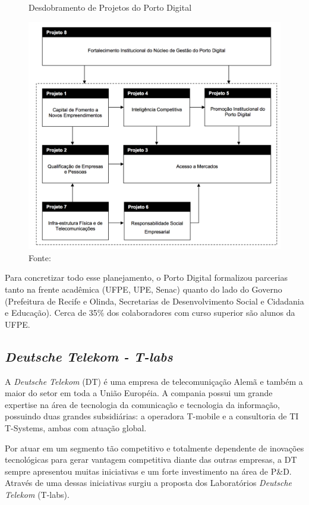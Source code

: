 \begin{figure}[h]
\caption{Desdobramento de Projetos do Porto Digital}
\centerline{\includegraphics[scale=0.5]{img/projetosPD}}
\label{fig:projetosPD}
\caption* {Fonte: }
\end{figure}

Para concretizar todo esse planejamento, o Porto Digital formalizou parcerias tanto na frente acadêmica (UFPE, UPE, Senac) quanto do lado do Governo (Prefeitura de Recife e Olinda, Secretarias de Desenvolvimento Social e Cidadania e Educação). Cerca de 35\% dos colaboradores com curso superior são alunos da UFPE.

\subsection{\textit{Deutsche Telekom - T-labs}}

A \textit{Deutsche Telekom} (DT) é uma empresa de telecomuniçação Alemã e também a maior do setor em toda a União Européia. A compania possui um grande expertise na área de tecnologia da comunicação e tecnologia da informação, possuindo duas grandes subsidiárias: a operadora T-mobile e a consultoria de TI T-Systems, ambas com atuação global.

Por atuar em um segmento tão competitivo e totalmente dependente de inovações tecnológicas para gerar vantagem competitiva diante das outras empresas, a DT sempre apresentou muitas iniciativas e um forte investimento na área de P\&D. Através de uma dessas iniciativas surgiu a proposta dos Laboratórios \textit{Deutsche Telekom} (T-labs).

